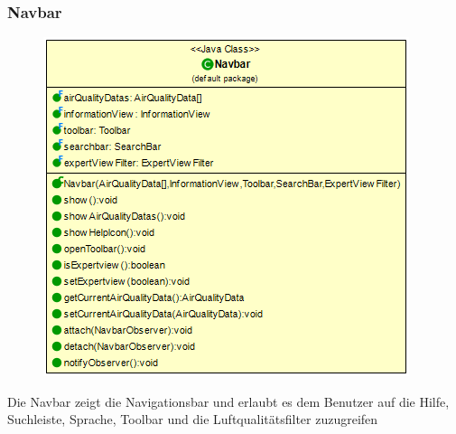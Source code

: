 \subsubsection{Navbar}
\begin{minipage}{0.3\textwidth}
    \begin{figure}[H]
        \includegraphics[scale = 0.5
        ]{media/view/navbar/Navbar_Class.png}
    \end{figure}
    \end{minipage} \hfill
    \begin{minipage}{0.6\textwidth}
Die Navbar zeigt die Navigationsbar und erlaubt es dem Benutzer auf die Hilfe, Suchleiste, Sprache, Toolbar und die Luftqualitätsfilter zuzugreifen
\end{minipage}
